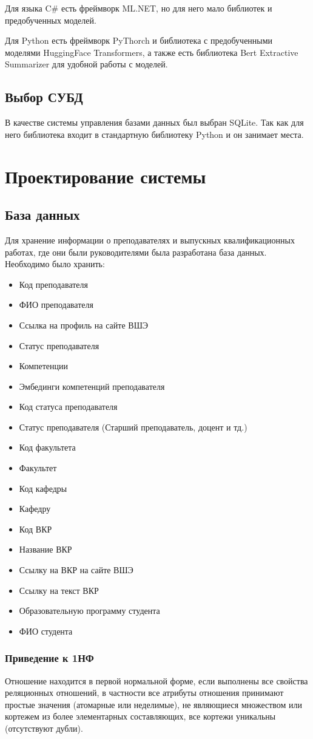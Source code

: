 \documentclass[PI,KR]{HSEUniversity}
\begin{document}
Для языка C\# есть фреймворк ML.NET, но для него мало библиотек и предобученных моделей.

Для Python есть фреймворк PyThorch и библиотека с предобученными моделями HuggingFace Transformers, а также есть библиотека Bert Extractive Summarizer для удобной работы с моделей.

\section{Выбор СУБД}
В качестве системы управления базами данных был выбран SQLite. Так как для него библиотека входит в стандартную библиотеку Python и он занимает места.
\chapter{Проектирование системы}
\section{База данных}
Для хранение информации о преподавателях и выпускных квалификационных работах, где они были руководителями была разработана база данных. Необходимо было хранить:
\begin{itemize}
	\item Код преподавателя
	\item ФИО преподавателя
	\item Ссылка на профиль на сайте ВШЭ	
	\item Статус преподавателя
	\item Компетенции
	\item Эмбединги компетенций преподавателя
	\item Код статуса преподавателя
	\item Статус преподавателя (Старший преподаватель, доцент и тд.)
	\item Код факультета
	\item Факультет
	\item Код кафедры
	\item Кафедру
	\item Код ВКР
	\item Название ВКР
	\item Ссылку на ВКР на сайте ВШЭ
	\item Ссылку на текст ВКР
	\item Образовательную программу студента
	\item ФИО студента
\end{itemize} 
\subsection{Приведение к 1НФ}
Отношение находится в первой нормальной форме, если выполнены все свойства реляционных отношений, в частности все атрибуты отношения принимают простые значения (атомарные или неделимые), не являющиеся множеством или кортежем из более элементарных составляющих, все кортежи уникальны (отсутствуют дубли).
\end{document}
